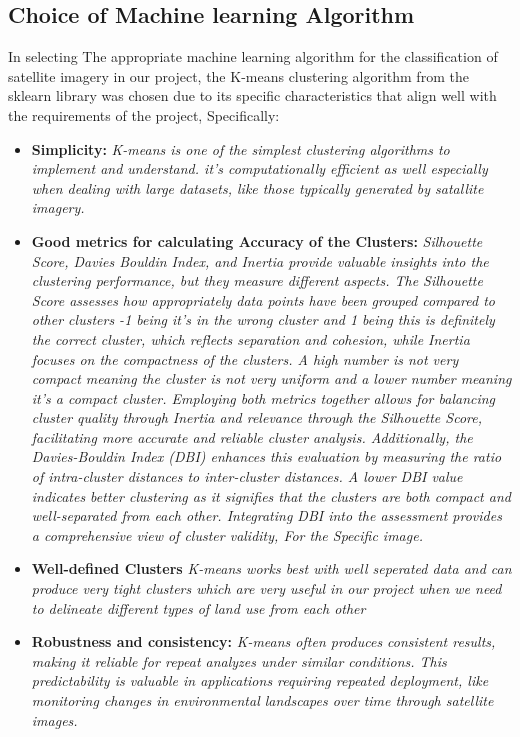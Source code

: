 \subsection{Choice of Machine learning Algorithm}\label{subsec:choice-of-machine-learning-algorithm}

In selecting The appropriate machine learning algorithm for the classification of satellite imagery in our project,
the K-means clustering algorithm from the sklearn library was chosen due to its specific characteristics that align well with the
requirements of the project, Specifically:

\begin{itemize}
    \item \textbf{Simplicity:}
    \textit{K-means is one of the simplest clustering algorithms to implement and understand. it's computationally efficient as well
    especially when dealing with large datasets, like those typically generated by satallite imagery.}
    \item \textbf{ Good metrics for calculating Accuracy of the Clusters:}
    \textit{Silhouette Score, Davies Bouldin Index, and Inertia provide valuable insights into the clustering performance, but they measure different aspects.
    The Silhouette Score assesses how appropriately data points have been grouped compared to other clusters -1 being it's in the
    wrong cluster and 1 being this is definitely the correct cluster, which reflects separation and cohesion,
        while Inertia focuses on the compactness of the clusters. A high number is not very compact meaning the cluster is not very uniform
        and a lower number meaning it's a compact cluster. Employing both metrics together allows for balancing cluster
        quality through Inertia and relevance through the Silhouette Score, facilitating more accurate and reliable cluster analysis.
        Additionally, the Davies-Bouldin Index (DBI) enhances this evaluation by measuring the ratio of intra-cluster distances to inter-cluster distances.
        A lower DBI value indicates better clustering as it signifies that the clusters are both compact and well-separated from each other.
        Integrating DBI into the assessment provides a comprehensive view of cluster validity, For the Specific image.}
    \item \textbf{Well-defined Clusters}
    \textit{K-means works best with well seperated data and can produce very tight clusters which are very useful in our project when we need to delineate
    different types of land use from each other}
    \item \textbf{Robustness and consistency:}
    \textit{K-means often produces consistent results, making it reliable for repeat analyzes under similar conditions.
    This predictability is valuable in applications requiring repeated deployment, like monitoring changes in environmental landscapes over time through satellite images.}
\end{itemize}



